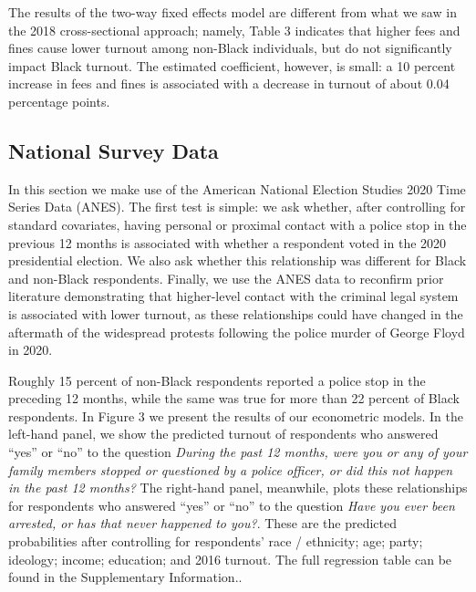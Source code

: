 \documentclass[
  12pt,
]{article}
\begin{document}
\begin{singlespace}

\end{singlespace}

The results of the two-way fixed effects model are different from what we saw in the 2018 cross-sectional approach; namely, Table 3 indicates that higher fees and fines cause lower turnout among non-Black individuals, but do not significantly impact Black turnout. The estimated coefficient, however, is small: a 10 percent increase in fees and fines is associated with a decrease in turnout of about 0.04 percentage points.

\hypertarget{national-survey-data-1}{%
\subsection*{National Survey Data}\label{national-survey-data-1}}

In this section we make use of the American National Election Studies 2020 Time Series Data (ANES). The first test is simple: we ask whether, after controlling for standard covariates, having personal or proximal contact with a police stop in the previous 12 months is associated with whether a respondent voted in the 2020 presidential election. We also ask whether this relationship was different for Black and non-Black respondents. Finally, we use the ANES data to reconfirm prior literature demonstrating that higher-level contact with the criminal legal system is associated with lower turnout, as these relationships could have changed in the aftermath of the widespread protests following the police murder of George Floyd in 2020.

Roughly 15 percent of non-Black respondents reported a police stop in the preceding 12 months, while the same was true for more than 22 percent of Black respondents. In Figure 3 we present the results of our econometric models. In the left-hand panel, we show the predicted turnout of respondents who answered ``yes'' or ``no'' to the question \emph{During the past 12 months, were you or any of your family members stopped or questioned by a police officer, or did this not happen in the past 12 months?} The right-hand panel, meanwhile, plots these relationships for respondents who answered ``yes'' or ``no'' to the question \emph{Have you ever been arrested, or has that never happened to you?}. These are the predicted probabilities after controlling for respondents' race / ethnicity; age; party; ideology; income; education; and 2016 turnout. The full regression table can be found in the Supplementary Information..
\end{document}
